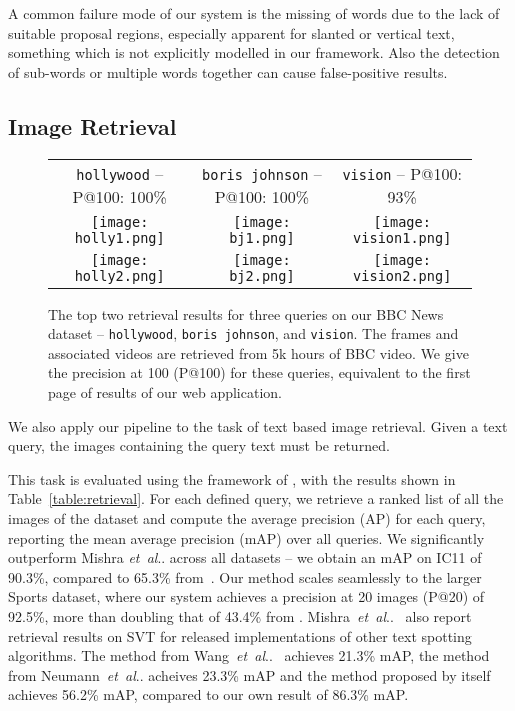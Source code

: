 \documentclass[twocolumn]{svjour3}          \smartqed  \usepackage{epsfig}
\makeatletter
\DeclareRobustCommand\onedot{\futurelet\@let@token\@onedot}
\def\@onedot{\ifx\@let@token.\else.\null\fi\xspace}
\def\etal{\emph{et~al}\onedot}
\makeatother
\begin{document}
A common failure mode of our system is the missing of words due to the lack of suitable proposal regions, especially apparent for slanted or vertical text, something which is not explicitly modelled in our framework. Also the detection of sub-words or multiple words together can cause false-positive results.

\subsection{Image Retrieval}
\label{sec:retrieval}

\begin{figure*}
\centering
\begin{center}
\begin{tabular}{c|c|c}
\texttt{hollywood} -- P@100: 100\% & \texttt{boris johnson} -- P@100: 100\% & \texttt{vision} -- P@100: 93\%\\
\texttt{[image: holly1.png]} & 
\texttt{[image: bj1.png]} &
\texttt{[image: vision1.png]}\\
\texttt{[image: holly2.png]} &
\texttt{[image: bj2.png]} &
\texttt{[image: vision2.png]}\\
\end{tabular}
\caption{The top two retrieval results for three queries on our BBC News dataset -- \texttt{hollywood}, \texttt{boris johnson}, and \texttt{vision}. The frames and associated videos are retrieved from 5k hours of BBC video. We give the precision at 100 (P@100) for these queries, equivalent to the first page of results of our web application.}
\label{fig:bbc}
\end{center}
\end{figure*}

We also apply our pipeline to the task of text based image retrieval. Given a text query, the images containing the query text must be returned. 

This task is evaluated using the framework of \cite{Mishra13}, with the results shown in Table~\ref{table:retrieval}. For each defined query, we retrieve a ranked list of all the images of the dataset and compute the average precision (AP) for each query, reporting the mean average precision (mAP) over all queries. We significantly outperform Mishra \etal across all datasets -- we obtain an mAP on IC11 of 90.3\%, compared to 65.3\% from~\cite{Mishra13}. Our method scales seamlessly to the larger Sports dataset, where our system achieves a precision at 20 images (P@20) of 92.5\%, more than doubling that of 43.4\% from \cite{Mishra13}. Mishra~\etal~\cite{Mishra13} also report retrieval results on SVT for released implementations of other text spotting algorithms. The method from Wang~\etal~\cite{Wang11} achieves 21.3\% mAP, the method from Neumann~\etal \cite{Neumann12} acheives 23.3\% mAP and the method proposed by \cite{Mishra13} itself achieves 56.2\% mAP, compared to our own result of 86.3\% mAP.
\end{document}
